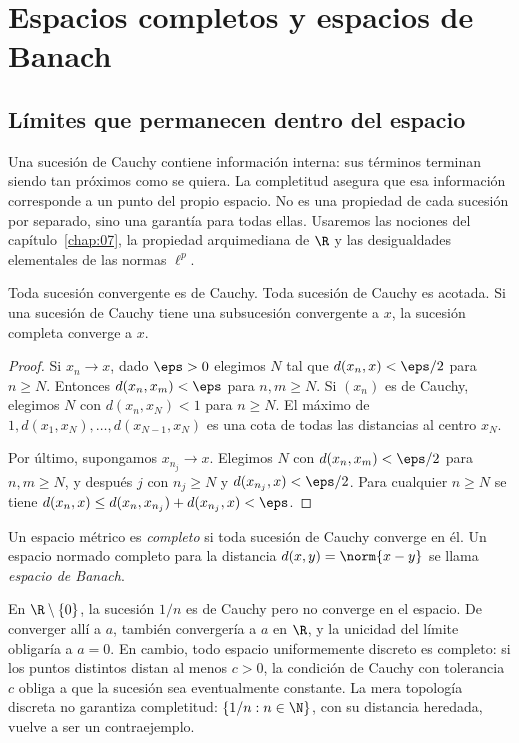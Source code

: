\chapter{Espacios completos y espacios de Banach}\label{chap:08}
\section{Límites que permanecen dentro del espacio}
Una sucesión de Cauchy contiene información interna: sus términos terminan siendo tan próximos como se quiera. La completitud asegura que esa información corresponde a un punto del propio espacio. No es una propiedad de cada sucesión por separado, sino una garantía para todas ellas. Usaremos las nociones del capítulo~\ref{chap:07}, la propiedad arquimediana de $\R$ y las desigualdades elementales de las normas $\ell^p$.

\begin{proposicion}\label{ch08:cauchy-basico}
Toda sucesión convergente es de Cauchy. Toda sucesión de Cauchy es acotada. Si una sucesión de Cauchy tiene una subsucesión convergente a $x$, la sucesión completa converge a $x$.
\end{proposicion}
\begin{proof}
Si $x_n\to x$, dado $\eps>0$ elegimos $N$ tal que $d(x_n,x)<\eps/2$ para $n\geq N$. Entonces $d(x_n,x_m)<\eps$ para $n,m\geq N$. Si $(x_n)$ es de Cauchy, elegimos $N$ con $d(x_n,x_N)<1$ para $n\geq N$. El máximo de $1,d(x_1,x_N),\ldots,d(x_{N-1},x_N)$ es una cota de todas las distancias al centro $x_N$.

Por último, supongamos $x_{n_j}\to x$. Elegimos $N$ con $d(x_n,x_m)<\eps/2$ para $n,m\geq N$, y después $j$ con $n_j\geq N$ y $d(x_{n_j},x)<\eps/2$. Para cualquier $n\geq N$ se tiene $d(x_n,x)\leq d(x_n,x_{n_j})+d(x_{n_j},x)<\eps$.
\end{proof}

\begin{definicion}
Un espacio métrico es \emph{completo} si toda sucesión de Cauchy converge en él. Un espacio normado completo para la distancia $d(x,y)=\norm{x-y}$ se llama \emph{espacio de Banach}.
\end{definicion}

\begin{ejemplo}
En $\R\setminus\{0\}$, la sucesión $1/n$ es de Cauchy pero no converge en el espacio. De converger allí a $a$, también convergería a $a$ en $\R$, y la unicidad del límite obligaría a $a=0$. En cambio, todo espacio uniformemente discreto es completo: si los puntos distintos distan al menos $c>0$, la condición de Cauchy con tolerancia $c$ obliga a que la sucesión sea eventualmente constante. La mera topología discreta no garantiza completitud: $\{1/n:n\in\N\}$, con su distancia heredada, vuelve a ser un contraejemplo.
\end{ejemplo}

